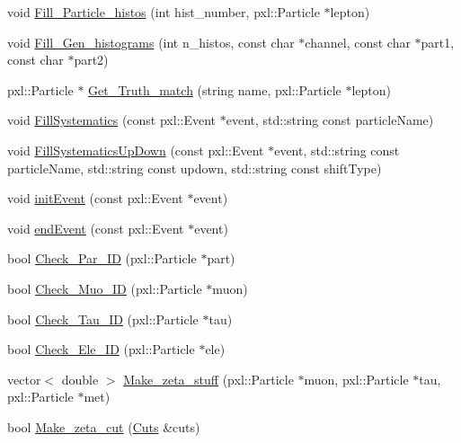 \begin{DoxyCompactItemize}
\item 
void \hyperlink{classspecialAna_a9c41a6185342e9e612796dc8e35cafaf}{Fill\-\_\-\-Particle\-\_\-histos} (int hist\-\_\-number, pxl\-::\-Particle $\ast$lepton)
\item 
void \hyperlink{classspecialAna_abdfb375e586c5403addc11fd579740ea}{Fill\-\_\-\-Gen\-\_\-histograms} (int n\-\_\-histos, const char $\ast$channel, const char $\ast$part1, const char $\ast$part2)
\item 
pxl\-::\-Particle $\ast$ \hyperlink{classspecialAna_a29be2d17ee48fc508fa2dd9dc7f09762}{Get\-\_\-\-Truth\-\_\-match} (string name, pxl\-::\-Particle $\ast$lepton)
\item 
void \hyperlink{classspecialAna_ab0c365edd2b99787852a8ca21b612672}{Fill\-Systematics} (const pxl\-::\-Event $\ast$event, std\-::string const particle\-Name)
\item 
void \hyperlink{classspecialAna_a2233cf73756ab1135592eda1daeb45e5}{Fill\-Systematics\-Up\-Down} (const pxl\-::\-Event $\ast$event, std\-::string const particle\-Name, std\-::string const updown, std\-::string const shift\-Type)
\item 
void \hyperlink{classspecialAna_a0dbcc8ff0def8509792f0256cbbad85e}{init\-Event} (const pxl\-::\-Event $\ast$event)
\item 
void \hyperlink{classspecialAna_a0f73f64ce2c3e2c50c822a006ba680c1}{end\-Event} (const pxl\-::\-Event $\ast$event)
\item 
bool \hyperlink{classspecialAna_a3da70eb8be6a5ccdf1e5566ccf275aed}{Check\-\_\-\-Par\-\_\-\-I\-D} (pxl\-::\-Particle $\ast$part)
\item 
bool \hyperlink{classspecialAna_aeb000115550c29442092ee8567970124}{Check\-\_\-\-Muo\-\_\-\-I\-D} (pxl\-::\-Particle $\ast$muon)
\item 
bool \hyperlink{classspecialAna_ae78625a0c42a7e30927996f4117ed2f5}{Check\-\_\-\-Tau\-\_\-\-I\-D} (pxl\-::\-Particle $\ast$tau)
\item 
bool \hyperlink{classspecialAna_a8ddbe8fd55d1f44ef6842bdea591fa0f}{Check\-\_\-\-Ele\-\_\-\-I\-D} (pxl\-::\-Particle $\ast$ele)
\item 
vector$<$ double $>$ \hyperlink{classspecialAna_afe8814caa57ef3d373cd16f34e10494a}{Make\-\_\-zeta\-\_\-stuff} (pxl\-::\-Particle $\ast$muon, pxl\-::\-Particle $\ast$tau, pxl\-::\-Particle $\ast$met)
\item 
bool \hyperlink{classspecialAna_a6ecfdf37feacbf9b285a521edcdca579}{Make\-\_\-zeta\-\_\-cut} (\hyperlink{classCuts}{Cuts} \&cuts)
\item 

\end{DoxyCompactItemize}
